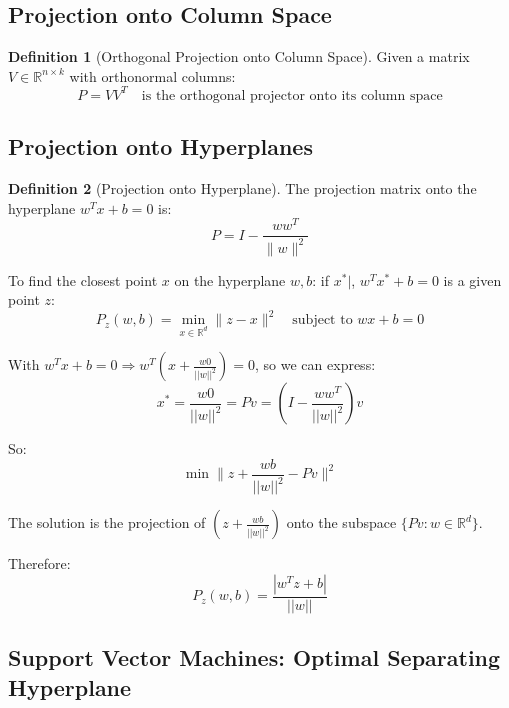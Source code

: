 \documentclass[12pt,a4paper]{article}
\theoremstyle{definition}
\newtheorem{definition}{Definition}[section]
\begin{document}
\subsection{Projection onto Column Space}

\begin{definition}[Orthogonal Projection onto Column Space]
Given a matrix $V \in \mathbb{R}^{n \times k}$ with orthonormal columns:
\[
P = VV^T \quad \text{is the orthogonal projector onto its column space}
\]
\end{definition}

\subsection{Projection onto Hyperplanes}

\begin{definition}[Projection onto Hyperplane]
The projection matrix onto the hyperplane $w^T x + b = 0$ is:
\[
P = I - \frac{ww^T}{\|w\|^2}
\]

To find the closest point $x$ on the hyperplane $w,b$: if $x^*|$, $w^T x^* + b = 0$ is a given point $z$:
\[
P_z(w,b) = \min_{x \in \mathbb{R}^d} \|z - x\|^2 \quad \text{subject to } wx + b = 0
\]

With $w^T x + b = 0 \Rightarrow w^T(x + \frac{w0}{||w||^2}) = 0$, so we can express:
\[
x^* = \frac{w0}{||w||^2} = P v = (I - \frac{ww^T}{||w||^2}) v
\]

So:
\[
\min \|z + \frac{wb}{||w||^2} - Pv\|^2
\]

The solution is the projection of $\left(z + \frac{wb}{||w||^2}\right)$ onto the subspace $\{Pv : w \in \mathbb{R}^d\}$.

Therefore:
\[
P_z(w,b) = \frac{|w^T z + b|}{||w||}
\]
\end{definition}

\subsection{Support Vector Machines: Optimal Separating Hyperplane}
\end{document}
